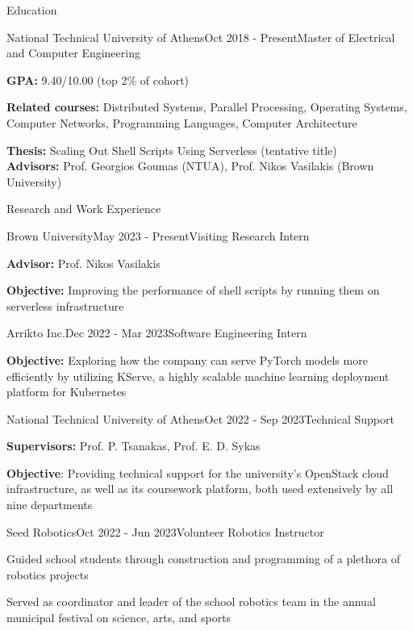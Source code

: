 \documentclass[letterpaper, 11pt]{resume}
\begin{document}
\begin{rSection}{Education}
    \begin{rSubsection}{National Technical University of Athens}{Oct 2018 - Present}{Master of Electrical and Computer Engineering}{}
        \item \textbf{GPA:} 9.40/10.00 (top 2\% of cohort)
        \item \textbf{Related courses:} Distributed Systems, Parallel Processing, Operating Systems, Computer Networks, Programming Languages, Computer Architecture
        \item \textbf{Thesis:} Scaling Out Shell Scripts Using Serverless (tentative title) \\
        \textbf{Advisors:} Prof. Georgios Goumas (NTUA), Prof. Nikos Vasilakis (Brown University)
    \end{rSubsection}
\end{rSection}

\begin{rSection}{Research and Work Experience}
    \begin{rSubsection}{Brown University}{May 2023 - Present}{Visiting Research Intern}{}
        \item \textbf{Advisor:} Prof. Nikos Vasilakis
        \item \textbf{Objective:} Improving the performance of shell scripts by running them on serverless infrastructure
    \end{rSubsection}

    \begin{rSubsection}{Arrikto Inc.}{Dec 2022 - Mar 2023}{Software Engineering Intern}{}
        \item \textbf{Objective:} Exploring how the company can serve PyTorch models more efficiently by utilizing KServe, a highly scalable machine learning deployment platform for Kubernetes
    \end{rSubsection}

    \begin{rSubsection}{National Technical University of Athens}{Oct 2022 - Sep 2023}{Technical Support}{}
        \item \textbf{Supervisors:} Prof. P. Tsanakas, Prof. E. D. Sykas
        \item \textbf{Objective}: Providing technical support for the university's OpenStack cloud infrastructure, as well as its coursework platform, both used extensively by all nine departments
    \end{rSubsection}

    \begin{rSubsection}{Seed Robotics}{Oct 2022 - Jun 2023}{Volunteer Robotics Instructor}{}
        \item Guided school students through construction and programming of a plethora of robotics projects
        \item Served as coordinator and leader of the school robotics team in the annual municipal festival on science, arts, and sports
    \end{rSubsection}
\end{rSection}
\end{document}
